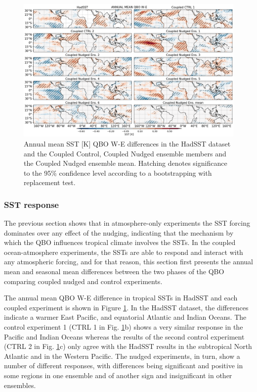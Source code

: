 \begin{figure}[t!]
\centering
 \includegraphics[width=\linewidth]{figures/sst_check_climqbowqboe.png}
\caption[Annual mean SST response to the QBO in coupled nudged experiments]{ Annual mean SST [K] QBO W-E differences in the HadSST dataset and the Coupled Control, Coupled Nudged ensemble members and the Coupled Nudged ensemble mean. Hatching denotes significance to the 95\% confidence level according to a bootstrapping with replacement test.}
\label{fig:sst_clim_coupled}
\end{figure}


\subsubsection{SST response}



The previous section shows that in atmosphere-only experiments the SST forcing dominates over any effect of the nudging, indicating that the mechanism by which the QBO influences tropical climate involves the SSTs. In the coupled ocean-atmosphere experiments, the SSTs are able to respond and interact with any atmospheric forcing, and for that reason, this section first presents the annual mean and seasonal mean differences between the two phases of the QBO comparing coupled nudged and control experiments. 

The annual mean QBO W-E difference in tropical SSTs in HadSST and each coupled experiment is shown in Figure \ref{fig:sst_clim_coupled}. In the HadSST dataset, the differences indicate a warmer East Pacific, and equatorial Atlantic and Indian Oceans. The control experiment 1 (CTRL 1 in Fig. \ref{fig:sst_clim_coupled}b) shows a very similar response in the Pacific and Indian Oceans whereas the results of the second control experiment (CTRL 2 in Fig. \ref{fig:sst_clim_coupled}c) only agree with the HadSST results in the subtropical North Atlantic and in the Western Pacific. 
The nudged experiments, in turn, show a number of different responses, with differences being significant and positive in some regions in one ensemble and of another sign and insignificant in other ensembles. 


